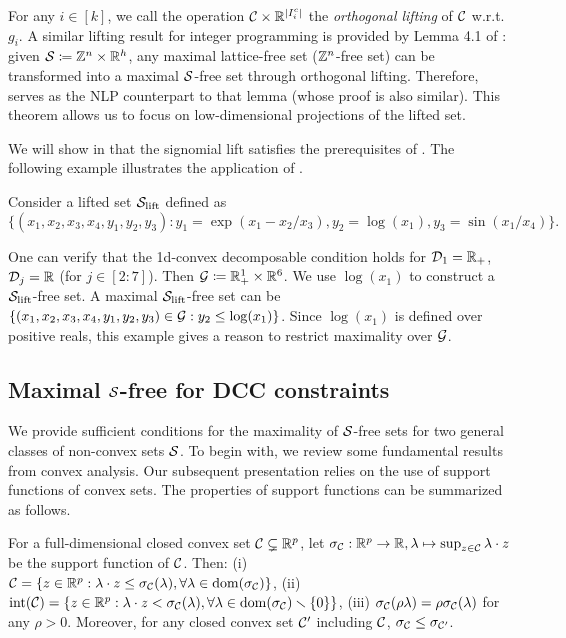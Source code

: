 For any $i\in[k]$, we call the operation $\mathcal C \times \mathbb R^{|I^c_i|}$ the \emph{orthogonal lifting} of $\mathcal C$ w.r.t. $g_i$. A similar lifting result for integer programming is provided by Lemma 4.1 of \cite{conforti2011}: given $\mathcal S \coloneqq \mathbb Z^{n} \times \mathbb R^{h}$, any maximal lattice-free set (\ie $\mathbb Z^n$-free set) can be transformed into a maximal $\mathcal S$-free set through orthogonal lifting. Therefore,  serves as the NLP counterpart to that lemma (whose proof is also similar). This theorem allows us to focus on low-dimensional projections of the lifted set.

 We will show in  that the signomial lift satisfies the prerequisites of  .
The following example illustrates the application of .

\begin{example}
 Consider a lifted set $\mathcal S_{\mathrm{lift}}$ defined as $$\{(x_1,x_2,x_3,x_4, y_1,y_2, y_3): y_1= \exp(x_1 - x_2 /x_3),  y_2 = \log(x_1), y_3 = \sin(x_1 / x_4)\}.$$

One can verify that the 1d-convex decomposable condition holds for $\mathcal D_1 = \mathbb R_+$,  $\mathcal D_j = \mathbb R$ (for $j \in [2:7]$). Then $\mathcal G\coloneqq \mathbb R^1_+ \times \mathbb R^6$.  We use $\log(x_1)$ to construct a $\mathcal S_{\mathrm{lift}}$-free set. A maximal $\mathcal S_{\mathrm{lift}}$-free set can be $\{(x_1,x_2,x_3,x_4, y_1,y_2, y_3) \in \mathcal G:  y_2 \le \log(x_1)\}$. Since $\log(x_1)$ is defined over positive  reals, this example gives a reason to restrict maximality over $\mathcal G$.
\end{example}




\subsection{Maximal $\mathcal S$-free for DCC constraints}

We provide sufficient conditions for the maximality of $\mathcal S$-free sets for two general classes of non-convex sets $\mathcal S$. To begin with, we review some fundamental results from convex analysis. Our subsequent presentation relies on the use of support functions of convex sets. The properties of support functions can be summarized as follows.


\begin{lemma}
\label{lem.supconv}
 For  a full-dimensional closed convex set  \(\mathcal C \subsetneq \mathbb R^p\), let \(\sigma_{\mathcal C}: \mathbb R^p \to \mathbb R, \lambda \mapsto \sup_{z \in \mathcal C}{\lambda}\cdot z\) be the support function of \(\mathcal C\). Then: (i) \label{lem.supconv2} \(\mathcal C = \{z \in \mathbb R^p: {\lambda}\cdot z\le \sigma_{\mathcal C}({\lambda}), \forall {\lambda} \in \operatorname{dom}(\sigma_{\mathcal C}) \}\), (ii)  \(\operatorname{int}(\mathcal C) = \{z \in \mathbb R^p:{\lambda}\cdot z <\sigma_{\mathcal C}({\lambda}),  \forall {\lambda} \in  \operatorname{dom}(\sigma_{\mathcal C})  \smallsetminus\{0\} \}\), (iii)
	$\sigma_{\mathcal C}(\rho \lambda) = \rho \sigma_{\mathcal C}(\lambda)$ for any $\rho > 0$. Moreover, for any closed convex set \(\mathcal C'\) including $\mathcal C$,   $\sigma_{\mathcal C} \le \sigma_{\mathcal C'}$.
\end{lemma}


